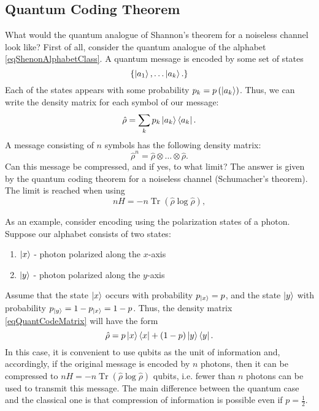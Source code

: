 \subsection{Quantum Coding Theorem}
What would the quantum analogue of Shannon's theorem for a noiseless channel look like? First of all, consider the quantum analogue of the alphabet
\eqref{eqShenonAlphabetClass}. A quantum message is encoded
by some set of states 
\begin{equation}
\left\{
\ket{a_1}, \dotsc \ket{a_k}.
\right\}
\label{eqSchumacherAlphabet}
\end{equation}
Each of the states appears with some probability $p_k =
p\left(\ket{a_k}\right)$. Thus, we can write
the density matrix for each symbol of our message:
\begin{equation}
\hat{\rho} = \sum_k p_k \ket{a_k}\bra{a_k}.
\label{eqQuantCodeMatrix}
\end{equation}
A message consisting of $n$ symbols has the following density matrix:
\begin{equation}
\hat{\rho}^n = \hat{\rho} \otimes \dots \otimes \hat{\rho}.
\nonumber
\end{equation}
Can this message be compressed, and if yes, to what limit? The answer
is given by the quantum coding theorem for a noiseless channel (Schumacher's theorem). The limit is reached when using 
\begin{equation}
n H = - n \operatorname{Tr} \left(\hat{\rho} \log \hat{\rho} \right),
\nonumber
\end{equation}

As an example, consider encoding using the polarization states of a photon. Suppose our alphabet consists of two
states:
\begin{enumerate}
\item $\ket{x}$ - photon polarized along the $x$-axis
\item $\ket{y}$ - photon polarized along the $y$-axis
\end{enumerate}
Assume that the state $\ket{x}$ occurs with
probability $p_{\ket{x}} = p$, and the state $\ket{y}$ with
probability $p_{\ket{y}} = 1 - p_{\ket{x}} = 1 - p$.
Thus, the density matrix 
\eqref{eqQuantCodeMatrix} will
have the form
\begin{equation}
\hat{\rho} = p \ket{x}\bra{x} + \left(1 - p\right)
\ket{y}\bra{y}.
\label{eqQuantCodeMatrixQBIT}
\end{equation}
In this case, it is convenient
to use qubits as the unit of information and, accordingly,
if the original message is encoded by $n$ photons, then it can be
compressed to 
\(
n H = - n \operatorname{Tr} \left(\hat{\rho} \log \hat{\rho} \right)
\)
qubits, i.e. fewer than $n$ photons  can be used to transmit
this message. The main difference between the quantum case and the classical one
is that compression of information is possible even if $p =
\frac{1}{2}$.